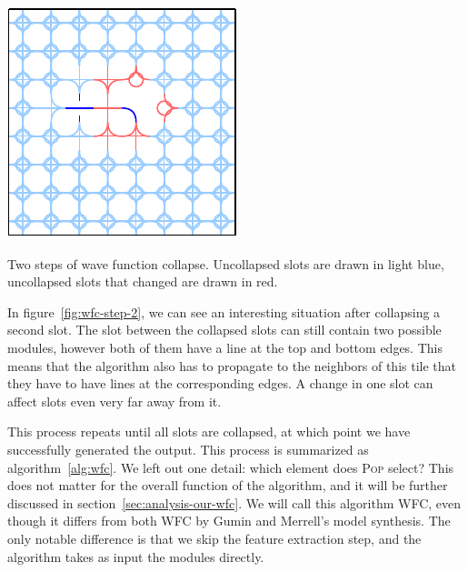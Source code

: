 \begin{center}
\begin{minipage}{.31\textwidth}
         \label{fig:wfc-step-1}
    \end{minipage}%
    \begin{minipage}{.31\textwidth}
        \centering
        \includegraphics[width=0.95\linewidth]{img/WFC step 2.pdf}
         \label{fig:wfc-step-2}
    \end{minipage}
    \caption{Two steps of wave function collapse. Uncollapsed slots are drawn in light blue, uncollapsed slots that changed are drawn in red.}
    \label{fig:wfc-steps}
\end{center}

In figure~\ref{fig:wfc-step-2}, we can see an interesting situation after collapsing a second slot.
The slot between the collapsed slots can still contain two possible modules, however both of them have a line at the top and bottom edges.
This means that the algorithm also has to propagate to the neighbors of this tile that they have to have lines at the corresponding edges.
A change in one slot can affect slots even very far away from it.

This process repeats until all slots are collapsed, at which point we have successfully generated the output.
This process is summarized as algorithm~\ref{alg:wfc}.
We left out one detail: which element does \textsc{Pop} select?
This does not matter for the overall function of the algorithm, and it will be further discussed in section~\ref{sec:analysis-our-wfc}.
We will call this algorithm WFC, even though it differs from both WFC by Gumin and Merrell's model synthesis.
The only notable difference is that we skip the feature extraction step, and the algorithm takes as input the modules directly.

